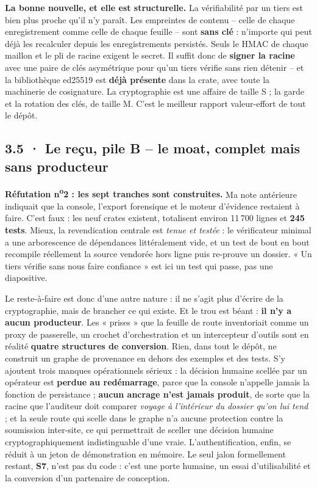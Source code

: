 \documentclass[10pt]{article}
\begin{document}
\begin{these}
\textbf{La bonne nouvelle, et elle est structurelle.} La vérifiabilité par un tiers est bien plus proche
qu'il n'y paraît. Les empreintes de contenu -- celle de chaque enregistrement comme celle de chaque
feuille -- sont \textbf{sans clé} : n'importe qui peut déjà les recalculer depuis les enregistrements
persistés. Seuls le HMAC de chaque maillon et le pli de racine exigent le secret. Il suffit donc de
\textbf{signer la racine} avec une paire de clés asymétrique pour qu'un tiers vérifie sans rien
détenir -- et la bibliothèque ed25519 est \textbf{déjà présente} dans la crate, avec toute la machinerie
de cosignature. La cryptographie est une affaire de taille S ; la garde et la rotation des clés, de
taille M. C'est le meilleur rapport valeur-effort de tout le dépôt.
\end{these}

\subsection{3.5 · Le reçu, pile B -- le moat, complet mais sans producteur}

\textbf{Réfutation n\textsuperscript{o}2 : les sept tranches sont construites.} Ma note antérieure
indiquait que la console, l'export forensique et le moteur d'évidence restaient à faire. C'est faux :
les neuf crates existent, totalisent environ 11\,700 lignes et \textbf{245 tests}. Mieux, la
revendication centrale est \emph{tenue et testée} : le vérificateur minimal a une arborescence de
dépendances littéralement vide, et un test de bout en bout recompile réellement la source vendorée hors
ligne puis re-prouve un dossier. « Un tiers vérifie sans nous faire confiance » est ici un test qui
passe, pas une diapositive.

Le reste-à-faire est donc d'une autre nature : il ne s'agit plus d'écrire de la cryptographie, mais de
brancher ce qui existe. Et le trou est béant : \textbf{il n'y a aucun producteur}. Les « prises » que la
feuille de route inventoriait comme un proxy de passerelle, un crochet d'orchestration et un
intercepteur d'outils sont en réalité \textbf{quatre structures de conversion}. Rien, dans tout le
dépôt, ne construit un graphe de provenance en dehors des exemples et des tests. S'y ajoutent trois
manques opérationnels sérieux : la décision humaine scellée par un opérateur est \textbf{perdue au
redémarrage}, parce que la console n'appelle jamais la fonction de persistance ; \textbf{aucun ancrage
n'est jamais produit}, de sorte que la racine que l'auditeur doit comparer \emph{voyage à l'intérieur du
dossier qu'on lui tend} ; et la seule route qui scelle dans le graphe n'a aucune protection contre la
soumission inter-site, ce qui permettrait de sceller une décision humaine cryptographiquement
indistinguable d'une vraie. L'authentification, enfin, se réduit à un jeton de démonstration en
mémoire. Le seul jalon formellement restant, \textbf{S7}, n'est pas du code : c'est une porte humaine,
un essai d'utilisabilité et la conversion d'un partenaire de conception.
\end{document}
